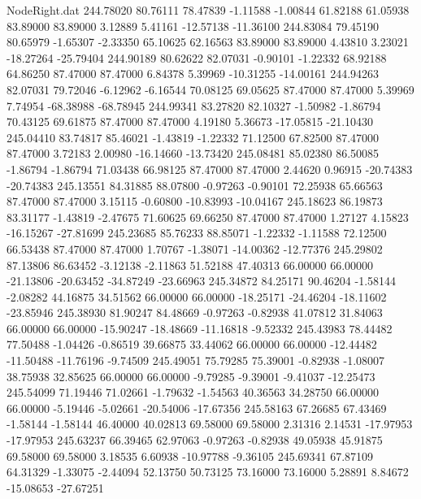 \begin{filecontents}{NodeRight.dat}
 244.78020   80.76111   78.47839    -1.11588   -1.00844   61.82188   61.05938   83.89000   83.89000    3.12889    5.41161  -12.57138  -11.36100
 244.83084   79.45190   80.65979    -1.65307   -2.33350   65.10625   62.16563   83.89000   83.89000    4.43810    3.23021  -18.27264  -25.79404
 244.90189   80.62622   82.07031    -0.90101   -1.22332   68.92188   64.86250   87.47000   87.47000    6.84378    5.39969  -10.31255  -14.00161
 244.94263   82.07031   79.72046    -6.12962   -6.16544   70.08125   69.05625   87.47000   87.47000    5.39969    7.74954  -68.38988  -68.78945
 244.99341   83.27820   82.10327    -1.50982   -1.86794   70.43125   69.61875   87.47000   87.47000    4.19180    5.36673  -17.05815  -21.10430
 245.04410   83.74817   85.46021    -1.43819   -1.22332   71.12500   67.82500   87.47000   87.47000    3.72183    2.00980  -16.14660  -13.73420
 245.08481   85.02380   86.50085    -1.86794   -1.86794   71.03438   66.98125   87.47000   87.47000    2.44620    0.96915  -20.74383  -20.74383
 245.13551   84.31885   88.07800    -0.97263   -0.90101   72.25938   65.66563   87.47000   87.47000    3.15115   -0.60800  -10.83993  -10.04167
 245.18623   86.19873   83.31177    -1.43819   -2.47675   71.60625   69.66250   87.47000   87.47000    1.27127    4.15823  -16.15267  -27.81699
 245.23685   85.76233   88.85071    -1.22332   -1.11588   72.12500   66.53438   87.47000   87.47000    1.70767   -1.38071  -14.00362  -12.77376
 245.29802   87.13806   86.63452    -3.12138   -2.11863   51.52188   47.40313   66.00000   66.00000  -21.13806  -20.63452  -34.87249  -23.66963
 245.34872   84.25171   90.46204    -1.58144   -2.08282   44.16875   34.51562   66.00000   66.00000  -18.25171  -24.46204  -18.11602  -23.85946
 245.38930   81.90247   84.48669    -0.97263   -0.82938   41.07812   31.84063   66.00000   66.00000  -15.90247  -18.48669  -11.16818   -9.52332
 245.43983   78.44482   77.50488    -1.04426   -0.86519   39.66875   33.44062   66.00000   66.00000  -12.44482  -11.50488  -11.76196   -9.74509
 245.49051   75.79285   75.39001    -0.82938   -1.08007   38.75938   32.85625   66.00000   66.00000   -9.79285   -9.39001   -9.41037  -12.25473
 245.54099   71.19446   71.02661    -1.79632   -1.54563   40.36563   34.28750   66.00000   66.00000   -5.19446   -5.02661  -20.54006  -17.67356
 245.58163   67.26685   67.43469    -1.58144   -1.58144   46.40000   40.02813   69.58000   69.58000    2.31316    2.14531  -17.97953  -17.97953
 245.63237   66.39465   62.97063    -0.97263   -0.82938   49.05938   45.91875   69.58000   69.58000    3.18535    6.60938  -10.97788   -9.36105
 245.69341   67.87109   64.31329    -1.33075   -2.44094   52.13750   50.73125   73.16000   73.16000    5.28891    8.84672  -15.08653  -27.67251

\end{filecontents}
